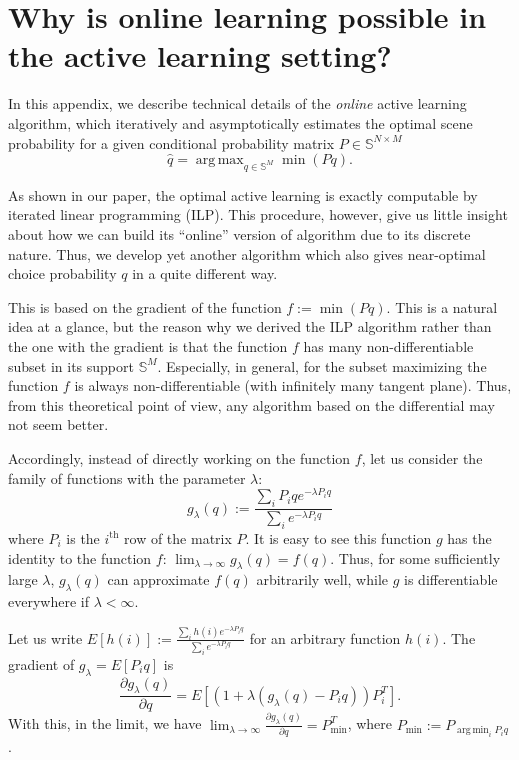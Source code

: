 \documentclass[a4paper,natbib,man]{apa6}
\newcommand{\Simplex}[1]{\mathbb{S}^{#1}}
\newcommand{\SimMats}[2]{\mathbb{S}^{#1 \times #2}}
\DeclareMathOperator*{\argmin}{arg\,min} %
\DeclareMathOperator*{\argmax}{arg\,max} %
\begin{document}
\section{Why is online learning possible in the active learning setting?}

In this appendix, we describe technical details of the {\em online} active learning algorithm, which 
iteratively and asymptotically estimates the optimal scene probability for a given conditional probability matrix $P \in \SimMats{N}{M}$
$$ \hat{q} = \argmax_{q \in \Simplex{M}} \min( P q ).$$

As shown in our paper, the optimal active learning is exactly computable by iterated linear programming (ILP). 
This procedure, however, give us little insight about how we can build its ``online'' version of algorithm due to its discrete nature. 
Thus, we develop yet another algorithm which also gives near-optimal choice probability $q$ in a quite different way.

This is based on the gradient of the function $f := \min( Pq )$. This is a natural idea at a glance, but the reason why we derived the ILP algorithm rather than the one with the gradient is that the function $f$ has many non-differentiable subset in its support $\Simplex{M}$. Especially, in general, for the subset maximizing the function $f$ is always non-differentiable (with infinitely many tangent plane). Thus, from this theoretical point of view, any algorithm based on the differential may not seem better.

Accordingly, instead of directly working on the function $f$, let us consider the family of functions with the parameter $\lambda$:
$$ g_{\lambda}(q) := \frac{ \sum_{i} P_{i}q e^{-\lambda P_{i}q} }{ \sum_{i} e^{-\lambda P_{i}q} }$$ where $P_{i}$ is the $i^{\text{th}}$ row of the matrix $P$.
It is easy to see this function $g$ has the identity to the function $f$: $\lim_{\lambda \to \infty} g_{\lambda}(q) = f(q)$.
Thus, for some sufficiently large $\lambda$, $g_{\lambda}(q)$ can approximate $f(q)$ arbitrarily well, while $g$ is differentiable everywhere if $\lambda < \infty$.

Let us write $E[ h(i) ] := \frac{ \sum_{i} h(i) e^{-\lambda P_{i}q} }{ \sum_{i} e^{-\lambda P_{i}q} }$ for an arbitrary function $h(i)$.
The gradient of $g_{\lambda} = E[P_{i}q]$ is
$$\frac{\partial g_{\lambda}(q)}{ \partial q} = E[(1+\lambda( g_{\lambda}(q) - P_{i}q ))P_{i}^{T}].$$ 
With this, in the limit, we have $\lim_{\lambda \to\infty}\frac{\partial g_{\lambda}(q)}{ \partial q} = P_{\min}^{T}$, where $P_{\min} := P_{\argmin_{i}P_{i}q}$.
\end{document}
